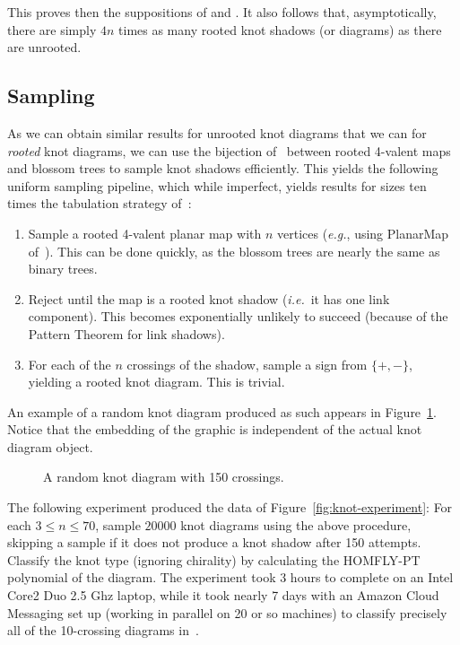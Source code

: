 \documentclass[submission%
]{dmtcs}
\begin{document}
This proves then the suppositions of
\cite{pzjschaeff2004planecurveasymp} and \cite{zuber2015mapsimsperms}.
It also follows that, asymptotically, there are simply $4n$ times as
many rooted knot shadows (or diagrams) as there are unrooted.

\subsection{Sampling}
\label{sec:sampling}

As we can obtain similar results for unrooted knot diagrams that we
can for \emph{rooted} knot diagrams, we can use the bijection
of~\cite{Schaeffer1997} between rooted 4-valent maps and blossom trees
to sample knot shadows efficiently. This yields the following uniform
sampling pipeline, which while imperfect, yields results for sizes ten
times the tabulation strategy of~\cite{CCMknotdiagrams2015}:

\begin{enumerate}
\item Sample a rooted 4-valent planar map with $n$ vertices
  (\textit{e.g.}, using PlanarMap of~\cite{SchaefferPlanarMap}). This can be
  done quickly, as the blossom trees are nearly the same as binary
  trees.
\item Reject until the map is a rooted knot shadow (\textit{i.e.}\ it
  has one link component). This becomes exponentially unlikely to
  succeed (because of the Pattern Theorem for link shadows).
\item For each of the $n$ crossings of the shadow, sample a sign from
  $\{+, -\}$, yielding a rooted knot diagram. This is trivial.
\end{enumerate}

An example of a random knot diagram produced as such appears in
Figure~\ref{fig:randomknot}. Notice that the embedding of the graphic
is independent of the actual knot diagram object.
\begin{figure}[htbp]
  \centering
  
  \caption{A random knot diagram with 150 crossings.}
  \label{fig:randomknot}
\end{figure}

The following experiment produced the data of
Figure~\ref{fig:knot-experiment}: For each $3 \le n \le 70$, sample
$20000$ knot diagrams using the above procedure, skipping a sample if
it does not produce a knot shadow after 150 attempts. Classify the
knot type (ignoring chirality) by calculating the HOMFLY-PT polynomial
of the diagram. The experiment took 3 hours to complete on an Intel
Core2 Duo 2.5 Ghz laptop, while it took nearly 7 days with an Amazon
Cloud Messaging set up (working in parallel on 20 or so machines) to
classify precisely all of the 10-crossing diagrams
in~\cite{CCMknotdiagrams2015}.
\end{document}
